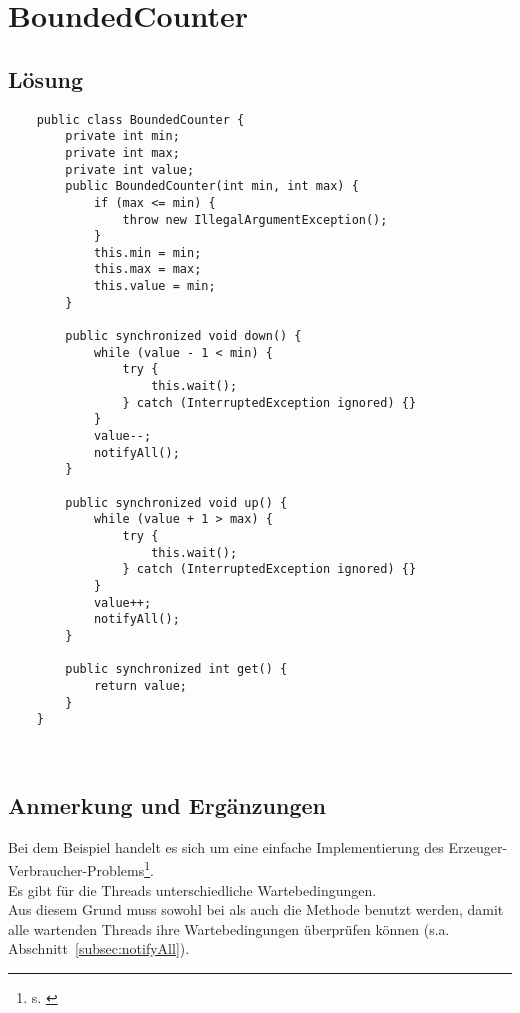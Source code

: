 \section{BoundedCounter}\label{ch:boundedcounter}


\subsection{Lösung}

\begin{verbatim}
    public class BoundedCounter {
        private int min;
        private int max;
        private int value;
        public BoundedCounter(int min, int max) {
            if (max <= min) {
                throw new IllegalArgumentException();
            }
            this.min = min;
            this.max = max;
            this.value = min;
        }

        public synchronized void down() {
            while (value - 1 < min) {
                try {
                    this.wait();
                } catch (InterruptedException ignored) {}
            }
            value--;
            notifyAll();
        }

        public synchronized void up() {
            while (value + 1 > max) {
                try {
                    this.wait();
                } catch (InterruptedException ignored) {}
            }
            value++;
            notifyAll();
        }

        public synchronized int get() {
            return value;
        }
    }
\end{verbatim}\\


\subsection{Anmerkung und Ergänzungen}

Bei dem Beispiel handelt es sich um eine einfache Implementierung des Erzeuger-Verbraucher-Problems\footnote{
s. \cite[Abschnitt 2.6.1]{Oec22}
}.\\
\noindent
Es gibt für die Threads unterschiedliche Wartebedingungen.\\
Aus diesem Grund muss sowohl bei  als auch  die Methode  benutzt werden, damit alle wartenden Threads ihre Wartebedingungen überprüfen können (s.a. Abschnitt~\ref{subsec:notifyAll}).\\

